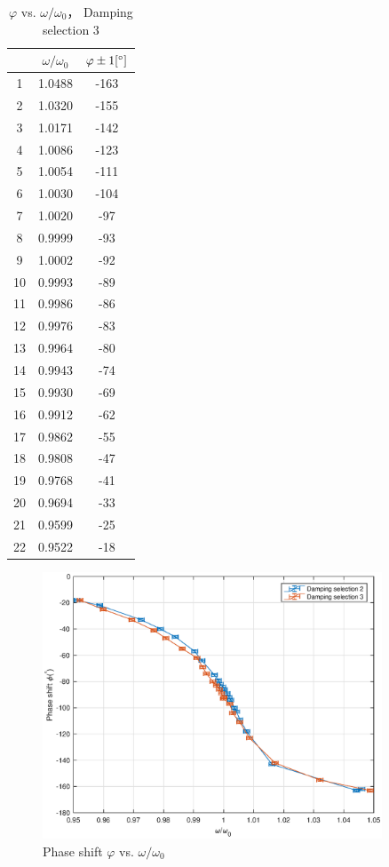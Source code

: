 \begin{table}[H]
\centering
\begin{tabular}{|c|c|c|}
\hline
& $\omega/\omega_0$ &  $\varphi \pm 1 [^\circ] $ \\ \hline
1  & 1.0488   & -163 \\ \hline
2  & 1.0320   & -155 \\ \hline
3  & 1.0171   & -142 \\ \hline
4  & 1.0086   & -123 \\ \hline
5  & 1.0054   & -111 \\ \hline
6  & 1.0030   & -104 \\ \hline
7  & 1.0020   &  -97 \\ \hline
8  & 0.9999   &  -93 \\ \hline
9  & 1.0002   &  -92 \\ \hline
10 & 0.9993   &  -89 \\ \hline
11 & 0.9986   &  -86 \\ \hline
12 & 0.9976   &  -83 \\ \hline
13 & 0.9964   &  -80 \\ \hline
14 & 0.9943   &  -74 \\ \hline
15 & 0.9930   &  -69 \\ \hline
16 & 0.9912   &  -62 \\ \hline
17 & 0.9862   &  -55 \\ \hline
18 & 0.9808   &  -47 \\ \hline
19 & 0.9768   &  -41 \\ \hline
20 & 0.9694   &  -33 \\ \hline
21 & 0.9599   &  -25 \\ \hline
22 & 0.9522   &  -18 \\ \hline
\end{tabular}    
\caption{$\varphi$ vs. $\omega/\omega_0$， Damping selection 3}\label{data_phi3}
\end{table}




\begin{figure}[H]
\centering
\includegraphics[width=0.9\textwidth]{matlab/p1}
\caption{Phase shift $\varphi$ vs. $\omega/\omega_0$}\label{phi}
\end{figure}


